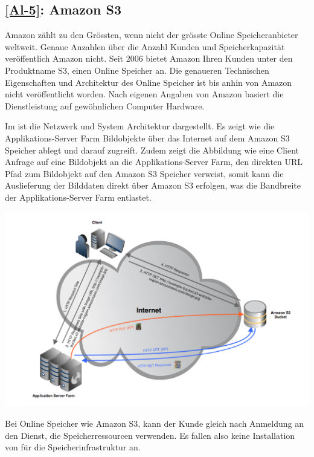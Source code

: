 \subsection{\ref{Al-5}: Amazon S3}
Amazon zählt zu den Grössten, wenn nicht der grösste Online Speicheranbieter weltweit. Genaue Anzahlen über die Anzahl Kunden und Speicherkapazität veröffentlich Amazon nicht. Seit 2006 bietet Amazon Ihren Kunden unter den Produktname S3, einen Online Speicher an. Die genaueren Technischen Eigenschaften und Architektur des Online Speicher ist bis anhin von Amazon nicht veröffentlicht worden. Nach eigenen Angaben von Amazon basiert die Dienstleistung auf gewöhnlichen Computer Hardware.

Im  ist die Netzwerk und System Architektur dargestellt. Es zeigt wie die Applikations-Server Farm Bildobjekte über das Internet auf dem Amazon S3 Speicher ablegt und darauf zugreift. Zudem zeigt die Abbildung wie eine Client Anfrage auf eine Bildobjekt an die Applikations-Server Farm, den direkten URL Pfad zum Bildobjekt auf den Amazon S3 Speicher verweist, somit kann die Auslieferung der Bilddaten direkt über Amazon S3 erfolgen, was die Bandbreite der Applikations-Server Farm entlastet. 

\begin{center}
\includegraphics[width=\linewidth, keepaspectratio = true]{media/Amazon_S3.png}
\end{center}




Bei Online Speicher wie Amazon S3, kann der Kunde gleich nach Anmeldung an den Dienst, die Speicherressourcen verwenden. Es fallen also keine Installation von für
die Speicherinfrastruktur an. 

